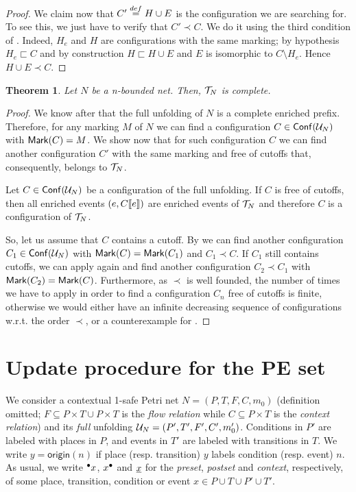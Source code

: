 \documentclass{article}
\newtheorem{theorem}{Theorem}
\newcommand{\origin}[1]{\ensuremath{\mathsf{origin}(#1)}}
\newcommand{\conf}[1]{\ensuremath{\mathsf{Conf}(#1)}}
\newcommand{\pe}{{\sc PE}}
\begin{document}
\begin{proof}
We claim now that $C' \stackrel{def}{=} H \cup E$ is the configuration we are searching
for.  To see this, we just have to verify that $C' \prec C$.  We do it using
the third condition of .  Indeed, $H_e$ and $H$ are
configurations with the same marking; by hypothesis $H_e \sqsubset C$ and by
construction $H \sqsubset H \cup E$ and $E$ is isomorphic to $C \setminus H_e$.
Hence $H \cup E \prec C$.
\end{proof}

\begin{theorem} Let $N$ be a n-bounded net.  Then, $\mathcal{T}_{N}$ is complete.
\end{theorem}

\begin{proof}
We know after  that the full unfolding of $N$ is a
complete enriched prefix.  Therefore, for any marking $M$ of $N$ we can find a
configuration $C \in \conf{\unf{N}}$ with $\mathsf{Mark }{(C)} = M$.  We show now that
for such configuration $C$ we can find another configuration $C'$ with the same
marking and free of cutoffs that, consequently, belongs to $\mathcal{T}_{N}$.

Let $C \in \conf{\unf{N}}$ be a configuration of the full unfolding.  If $C$ is
free of cutoffs, then all enriched events $(e, C[\![ e]\!])$ are enriched events
of $\mathcal{T}_{N}$ and therefore $C$ is a configuration of $\mathcal{T}_{N}$.

So, let us assume that $C$ contains a cutoff. By  we
can find another configuration $C_1 \in \conf{\unf{N}}$ with $\mathsf{Mark }{(C)} =
\mathsf{Mark }{(C_1)}$ and $C_1 \prec C$.  If $C_1$ still contains cutoffs, we can
apply again  and find another configuration $C_2 \prec
C_1$ with $\mathsf{Mark }{(C_2)} = \mathsf{Mark }{(C)}$.  Furthermore, as $\prec$ is well
founded, the number of times we have to apply  in
order to find a configuration $C_n$ free of cutoffs is finite,  otherwise we
would either have an infinite decreasing sequence of configurations w.r.t. the
order $\prec$, or a counterexample for .
\end{proof}


\newpage
\section{Update procedure for the \pe{} set}

We consider a contextual 1-safe Petri net $N = (P, T, F, C, m_0)$ (definition
omitted; $F \subseteq P \times T \cup P \times T$ is the \emph{flow relation}
while $C \subseteq P \times T$ is the \emph{context relation}) and its
\emph{full} unfolding $\mathcal{U}_{N} = (P', T', F', C', m_0')$.  Conditions in $P'$
are labeled with places in $P$, and events in $T'$ are labeled with transitions
in $T$.  We write $y = \origin{n}$ if place (resp. transition) $y$ labels
condition (resp. event) $n$.  As usual, we write ${}^\bullet x$, $x^\bullet$ and
$\underline{x}$ for the \emph{preset}, \emph{postset} and \emph{context},
respectively, of some place, transition, condition or event $x \in P \cup T
\cup P' \cup T'$.
\end{document}
